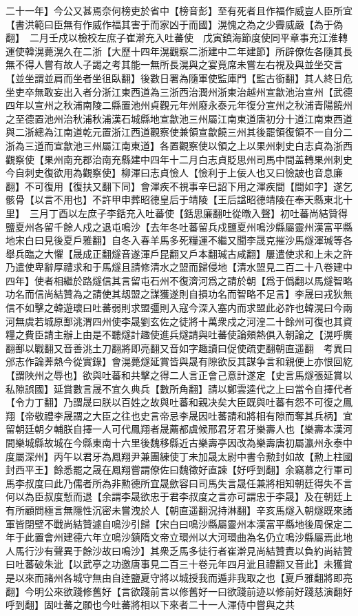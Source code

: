 二十一年】今公又甚焉奈何榜吏於省中【榜音彭】至有死者且作福作威豈人臣所宜【書洪範曰臣無有作威作福其害于而家凶于而國】滉愧之為之少霽威嚴【為于偽翻】　二月壬戍以檢校左庶子崔澣充入吐蕃使　戊寅鎮海節度使同平章事充江淮轉運使韓滉薨滉久在二浙【大歷十四年滉觀察二浙建中二年建節】所辟僚佐各隨其長無不得人嘗有故人子謁之考其能一無所長滉與之宴竟席未嘗左右視及與並坐交言【並坐謂並肩而坐者坐徂臥翻】後數日署為隨軍使監庫門【監古銜翻】其人終日危坐吏卒無敢妄出入者分浙江東西道為三浙西治潤州浙東治越州宣歙池治宣州【武德四年以宣州之秋浦南陵二縣置池州貞觀元年州廢永泰元年復分宣州之秋浦青陽饒州之至德置池州治秋浦秋浦漢石城縣地宣歙池三州屬江南東道唐初分十道江南東西道與二浙總為江南道乾元置浙江西道觀察使兼領宣歙饒三州其後罷領復領不一自分二浙為三道而宣歙池三州屬江南東道】各置觀察使以領之上以果州刺史白志貞為浙西觀察使【果州南充郡治南充縣建中四年十二月白志貞貶思州司馬中間盖轉果州刺史今自刺史復欲用為觀察使】柳渾曰志貞憸人【憸利于上佞人也又曰憸詖也音息廉翻】不可復用【復扶又翻下同】會渾疾不視事辛巳詔下用之渾疾間【間如字】遂乞骸骨【以言不用也】不許甲申葬昭德皇后于靖陵【王后諡昭德靖陵在奉天縣東北十里】　三月丁酉以左庶子李銛充入吐蕃使【銛思廉翻吐從暾入聲】初吐蕃尚結贊得鹽夏州各留千餘人戍之退屯鳴沙【去年冬吐蕃留兵戍鹽夏州鳴沙縣屬靈州漢富平縣地宋白曰見後夏戶雅翻】自冬入春羊馬多死糧運不繼又聞李晟克摧沙馬燧渾瑊等各舉兵臨之大懼【晟成正翻燧音遂渾戶昆翻又戶本翻瑊古咸翻】屢遣使求和上未之許乃遣使卑辭厚禮求和于馬燧且請修清水之盟而歸侵地【清水盟見二百二十八卷建中四年】使者相繼於路燧信其言留屯石州不復濟河爲之請於朝【爲于僞翻以馬燧智略功名而信尚結贊為之請使其刼盟之謀獲遂則自損功名而智略不足言】李晟曰戎狄無信不如擊之韓遊瓌曰吐蕃弱則求盟彊則入寇今深入塞内而求盟此必詐也韓滉曰今兩河無虞若城原鄯洮渭四州使李晟劉玄佐之徒將十萬衆戍之河湟二十餘州可復也其資糧之費臣請主辦上由是不聽燧計趣使進兵燧請與吐蕃使論頰熱俱入朝論之【滉呼廣翻鄯以戰翻又音善洮土刀翻將即亮翻又音如字趣讀曰促使疏吏翻朝直遥翻　考異曰邠志作論莾熱今從實錄】會滉薨燧延賞皆與晟有隙欲反其謀争言和親便上亦恨回紇【謂陜州之辱也】欲與吐蕃和共擊之得二人言正會己意計遂定【史言馬燧張延賞以私隙誤國】延賞數言晟不宜久典兵【數所角翻】請以鄭雲逵代之上曰當令自擇代者【令力丁翻】乃謂晟曰朕以百姓之故與吐蕃和親决矣大臣既與吐蕃有怨不可復之鳳翔【帝敬禮李晟謂之大臣之往也史言帝忌李晟因吐蕃請和將相有隙而奪其兵柄】宜留朝廷朝夕輔朕自擇一人可代鳳翔者晟薦都虞候邢君牙君牙樂壽人也【樂壽本漢河間樂城縣故城在今縣東南十六里後魏移縣近古樂壽亭因改為樂壽唐初屬瀛州永泰中度屬深州】丙午以君牙為鳳翔尹兼團練使丁未加晟太尉中書令勲封如故【勲上柱國封西平王】餘悉罷之晟在鳳翔嘗謂僚佐曰魏徵好直諫【好呼到翻】余竊慕之行軍司馬李叔度曰此乃儒者所為非勲德所宜晟歛容曰司馬失言晟任兼將相知朝廷得失不言何以為臣叔度慙而退【余謂李晟欲忠于君李叔度之言亦可謂忠于李晟】及在朝廷上有所顧問極言無隱性沉密未嘗洩於人【朝直遥翻況持淋翻】辛亥馬燧入朝燧既來諸軍皆閉壁不戰尚結贊遽自鳴沙引歸【宋白曰鳴沙縣屬靈州本漢富平縣地後周保定二年于此置會州建德六年立鳴沙鎮隋文帝立環州以大河環曲為名仍立鳴沙縣屬焉此地人馬行沙有聲異于餘沙故曰鳴沙】其衆乏馬多徒行者崔澣見尚結贊責以負約尚結贊曰吐蕃破朱泚【以武亭之功邀唐事見二百三十卷元年四月泚且禮翻又音此】未獲賞是以來而諸州各城守無由自逹鹽夏守將以城授我而遁非我取之也【夏戶雅翻將即亮翻】今明公來欲踐修舊好【言欲踐前言以修舊好一曰欲踐前迹以修前好踐慈演翻好呼到翻】固吐蕃之願也今吐蕃將相以下來者二十一人渾侍中嘗與之共